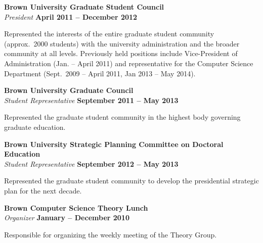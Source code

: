 \documentclass[margin,line]{resume}
\begin{document}
{\bf Brown University Graduate Student Council}\\
{\em President} \hfill {\bf April 2011 -- December 2012}

\begin{list2}
\vspace*{.05in}
\item Represented the interests of the entire graduate student community
  (approx.~2000 students) with the university administration and the broader
  community at all levels. Previously held positions include Vice-President of
  Administration (Jan. -- April 2011) and representative for the Computer Science
  Department (Sept.~2009 -- April 2011, Jan 2013 -- May 2014).
\end{list2}

{\bf Brown University Graduate Council}\\
{\em Student Representative} \hfill {\bf September 2011 -- May 2013}

\begin{list2}
\vspace*{.05in}
\item Represented the graduate student community in the highest
  body governing graduate education.
\end{list2}

{\bf Brown University Strategic Planning Committee on Doctoral Education}\\
{\em Student Representative} \hfill {\bf September 2012 -- May 2013}

\begin{list2}
\vspace*{.05in}
\item Represented the graduate student community to develop
  the presidential strategic plan for the next decade.
\end{list2}

{\bf Brown Computer Science Theory Lunch}\\
{\em Organizer} \hfill {\bf January -- December 2010 }

\begin{list2}
\vspace*{.05in}
\item Responsible for organizing the weekly meeting of the Theory Group.
\end{list2}
\end{document}
